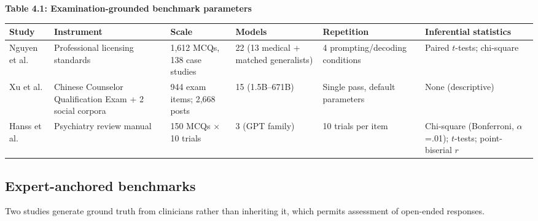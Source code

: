 \documentclass[11pt]{article}
\begin{document}
	\begin{center}
		\textbf{Table 4.1: Examination-grounded benchmark parameters}
		\vspace{2pt}
		
		\scriptsize
		\setlength{\tabcolsep}{3pt}\renewcommand{\arraystretch}{1.1}
		\begin{tabularx}{\textwidth}{|X|X|X|X|X|X|}
			\hline
			\textbf{Study} & \textbf{Instrument} & \textbf{Scale} & \textbf{Models} & \textbf{Repetition} & \textbf{Inferential statistics} \\
			\hline
			Nguyen et al.\cite{nguyen-etal-2025-large} & Professional licensing standards & 1,612 MCQs, 138 case studies & 22 (13 medical + matched generalists) & 4 prompting/decoding conditions & Paired $t$-tests; chi-square \\
			\hline
			Xu et al.\cite{Xu2025} & Chinese Counselor Qualification Exam + 2 social corpora & 944 exam items; 2,668 posts & 15 (1.5B--671B) & Single pass, default parameters & None (descriptive) \\
			\hline
			Hanss et al.\cite{Hanss2025} & Psychiatry review manual & 150 MCQs $\times$ 10 trials & 3 (GPT family) & 10 trials per item & Chi-square (Bonferroni, $\alpha$=.01); $t$-tests; point-biserial $r$ \\
			\hline
		\end{tabularx}
	\end{center}
	
	\subsection{Expert-anchored benchmarks}
	
	Two studies generate ground truth from clinicians rather than inheriting it, which permits assessment of open-ended responses.
	
\end{document}

